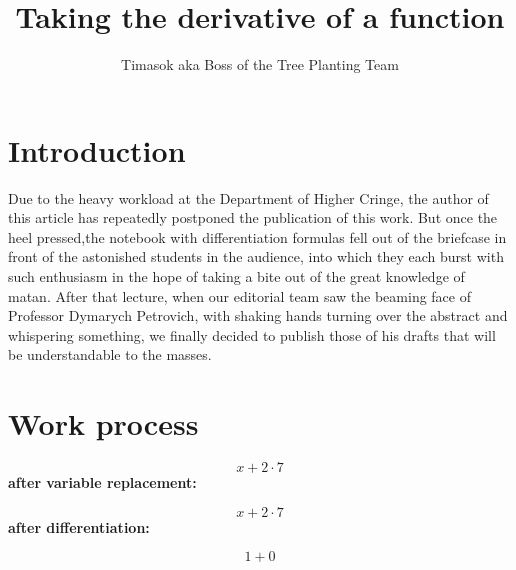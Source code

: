 \documentclass{article}
\title{\textbf{Taking the derivative of a function}}
\author{Timasok aka Boss of the Tree Planting Team}
\begin{document}
\maketitle
\section{Introduction}
Due to the heavy workload at the Department of Higher Cringe, the author of this article has repeatedly postponed the publication of this work. But once the heel pressed,the notebook with differentiation formulas fell out of the briefcase in front of the astonished students in the audience, into which they each burst with such enthusiasm in the hope of taking a bite out of the great knowledge of matan. After that lecture, when our editorial team saw the beaming face of Professor Dymarych Petrovich, with shaking hands turning over the abstract and whispering something, we finally decided to publish those of his drafts that will be understandable to the masses. 
\section{Work process}

$$
x+2\cdot 7
$$
\textbf{after variable replacement:}

$$
x+2\cdot 7
$$
\textbf{after differentiation:}

$$
1+0
$$
\end{document}
